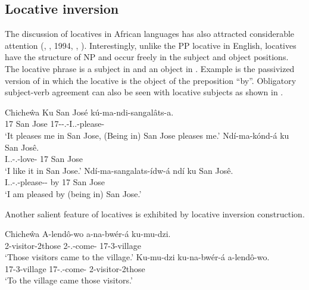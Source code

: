\documentclass[output=paper,hidelinks]{langscibook}
\begin{document}
\subsection{Locative inversion}
\label{sec:African:2.5}

The discussion of locatives in African languages has also attracted considerable attention (\citealt{bresnan1989locative}, \citealt{Bresnan1991}, 1994, \citealt{Moshi:Locatives}, \citealt{Morapedi2010}). Interestingly, unlike the PP locative in English, locatives have the structure of NP and occur freely in the subject and object positions. The locative phrase is a subject in  and an object in . Example  is the passivized version of  in which the locative is the object of the preposition “by”. Obligatory subject-verb agreement can also be seen with locative subjects as shown in .

\ea\label{ex:African:49}Chiche\^wa \citep[58]{Bresnan1991}
\ea\label{ex:African:49a}
    \gll  Ku San José kú-ma-ndi-sangal\^{a}ts-a.\\
        17  San Jose 17-{\SBJ}-{\PRS}.-I.{\SG}.\OBJ-please-{\IND}\\
    \glt ‘It pleases me in San Jose, (Being in) San Jose pleases me.’
\ex\label{ex:African:49b}
    \gll  Ndí-ma-kónd-á ku San Jos\^{e}.\\
        I.{\SG}.{\SBJ}-{\PRS}.-love-{\IND}   17  San Jose\\
    \glt ‘I like it in San Jose.’
\ex\label{ex:African:49c}
    \gll  Ndí-ma-sangalats-ídw-á ndí ku San Jos\^{e}.\\
        I.{\SG}.{\SBJ}-{\PRS}.-please-{\PASS}-{\IND}  by   17  San Jose\\
    \glt ‘I am pleased by (being in) San Jose.’
\z
\z

Another salient feature of locatives is exhibited by locative inversion construction.

\ea\label{ex:African:50}Chiche\^wa \citep[60]{Bresnan1991}
\ea\label{ex:African:50a}
    \gll A-lend\^{o}-wo a-na-bwér-á ku-mu-dzi.\\
        2-visitor-2those  2{\SBJ}-{.\PST}-come-{\IND}  17-3-village\\
    \glt‘Those visitors came to the village.’
\ex\label{ex:African:50b}
    \gll Ku-mu-dzi ku-na-bwér-á a-lend\^{o}-wo.\\
        17-3-village        17{\SBJ}-{.\PST}-come-{\IND} 2-visitor-2those\\
    \glt‘To the village came those visitors.’
\z
\z
          
\end{document}

